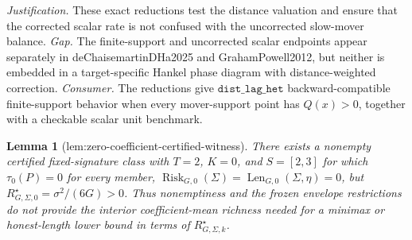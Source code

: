 \documentclass{article}
\newtheorem{lemma}{Lemma}
\begin{document}
\par\smallskip\noindent \textit{Justification.} These exact reductions test the distance valuation and ensure that the corrected scalar rate is not confused with the uncorrected slow-mover balance. \textit{Gap.} The finite-support and uncorrected scalar endpoints appear separately in deChaisemartinDHa2025 and GrahamPowell2012, but neither is embedded in a target-specific Hankel phase diagram with distance-weighted correction. \textit{Consumer.} The reductions give \(\texttt{dist\_lag\_het}\) backward-compatible finite-support behavior when every mover-support point has \(Q(x)>0\), together with a checkable scalar unit benchmark.

\begin{lemma}[lem:zero-coefficient-certified-witness]\label{lem:zero-coefficient-certified-witness}
There exists a nonempty certified fixed-signature class with \(T=2\), \(K=0\), and \(S=[2,3]\) for which \(\tau_0(P)=0\) for every member, \(\operatorname{Risk}_{G,0}(\Sigma)=\operatorname{Len}_{G,0}(\Sigma,\eta)=0\), but \(R_{G,\Sigma,0}^{\star}=\sigma^2/(6G)>0\). Thus nonemptiness and the frozen envelope restrictions do not provide the interior coefficient-mean richness needed for a minimax or honest-length lower bound in terms of \(R_{G,\Sigma,k}^{\star}\).
\end{lemma}
\end{document}
